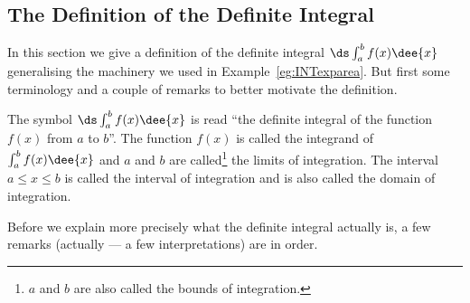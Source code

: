 \subsection{The Definition of the Definite Integral}\label{sec:defInt}

In this section we give a definition of the definite integral $\ds \int_a^b f(x)\dee{x}$
generalising the machinery we used in Example~\ref{eg:INTexparea}. But first some
terminology and a couple of remarks to better motivate the definition.
\begin{notn}
The symbol $\ds \int_a^b f(x)\dee{x}$ is read ``the definite integral of the function
$f(x)$ from $a$ to $b$''. The function $f(x)$ is called the integrand of $\int_a^b
f(x)\dee{x}$ and $a$ and $b$ are called\footnote{$a$ and $b$ are also called the bounds of integration.} the limits of integration. The interval $a\le x
\le b$ is called the interval of integration and is also called the domain of integration.
\end{notn}
Before we explain more precisely what the definite integral actually is, a few remarks
(actually --- a few interpretations) are in order.
